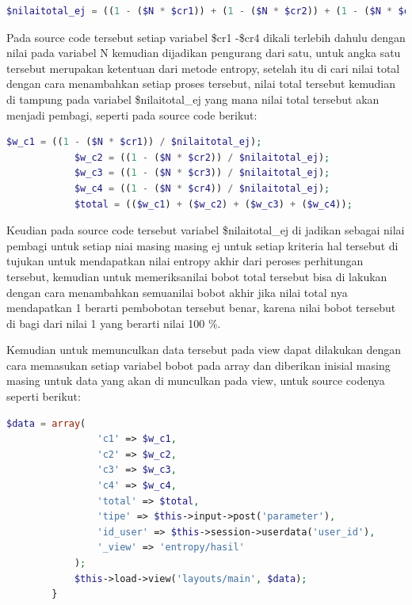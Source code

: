 \begin{lstlisting}[language=PHP]
$nilaitotal_ej = ((1 - ($N * $cr1)) + (1 - ($N * $cr2)) + (1 - ($N * $cr3)) + (1 - ($N * $cr4)));
\end{lstlisting}

Pada source code tersebut setiap variabel \$cr1 -\$cr4 dikali terlebih dahulu dengan nilai pada variabel N kemudian dijadikan pengurang dari satu, untuk angka satu tersebut merupakan ketentuan dari metode entropy, setelah itu di cari nilai total dengan cara menambahkan setiap proses tersebut, nilai total tersebut kemudian di tampung pada variabel \$nilaitotal\_ej yang mana nilai total tersebut akan menjadi pembagi, seperti pada source code berikut:\par

\begin{lstlisting}[language=PHP]
	$w_c1 = ((1 - ($N * $cr1)) / $nilaitotal_ej);  
	        $w_c2 = ((1 - ($N * $cr2)) / $nilaitotal_ej);  
	        $w_c3 = ((1 - ($N * $cr3)) / $nilaitotal_ej);  
	        $w_c4 = ((1 - ($N * $cr4)) / $nilaitotal_ej);  
	        $total = (($w_c1) + ($w_c2) + ($w_c3) + ($w_c4)); 
\end{lstlisting}

Keudian pada source code tersebut variabel \$nilaitotal\_ej di jadikan sebagai nilai pembagi untuk setiap niai masing masing ej untuk setiap kriteria hal tersebut di tujukan untuk mendapatkan nilai entropy akhir dari peroses perhitungan tersebut, kemudian untuk memeriksanilai bobot total tersebut bisa di lakukan dengan cara menambahkan semuanilai bobot akhir jika nilai total nya mendapatkan 1 berarti pembobotan tersebut benar, karena nilai bobot tersebut di bagi dari nilai 1 yang berarti nilai 100 \%.\par
	Kemudian untuk memunculkan data tersebut pada view dapat dilakukan dengan cara memasukan setiap variabel bobot pada array dan diberikan inisial masing masing untuk data yang akan di munculkan pada view, untuk source codenya seperti berikut:\par

\begin{lstlisting}[language=PHP]
	 $data = array(  
	            'c1' => $w_c1,  
	            'c2' => $w_c2,  
	            'c3' => $w_c3,  
	            'c4' => $w_c4,  
	            'total' => $total,  
	            'tipe' => $this->input->post('parameter'),  
	            'id_user' => $this->session->userdata('user_id'),  
	            '_view' => 'entropy/hasil'  
	        );  
	        $this->load->view('layouts/main', $data);  
	    }  
\end{lstlisting}

